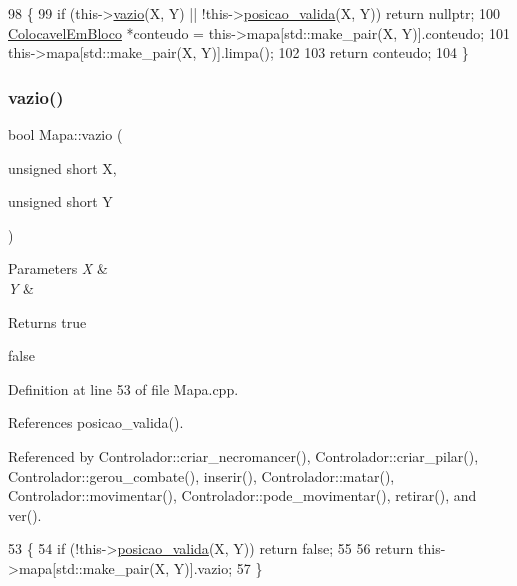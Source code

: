 \begin{DoxyCode}
98                                                                   \{
99     \textcolor{keywordflow}{if} (this->\mbox{\hyperlink{class_mapa_a5bdde997d3c97c5b6fb7d37c124cdf93}{vazio}}(X, Y) || !this->\mbox{\hyperlink{class_mapa_aa07c1444720958b3efbc734d2691361d}{posicao\_valida}}(X, Y)) \textcolor{keywordflow}{return} \textcolor{keyword}{nullptr};
100     \mbox{\hyperlink{class_colocavel_em_bloco}{ColocavelEmBloco}} *conteudo = this->mapa[std::make\_pair(X, Y)].conteudo;
101     this->mapa[std::make\_pair(X, Y)].limpa();
102 
103     \textcolor{keywordflow}{return} conteudo;
104 \}
\end{DoxyCode}
\mbox{\label{class_mapa_a5bdde997d3c97c5b6fb7d37c124cdf93}} 
\subsubsection{\texorpdfstring{vazio()}{vazio()}}
{\footnotesize\ttfamily bool Mapa\+::vazio (\begin{DoxyParamCaption}\item[{unsigned short}]{X,  }\item[{unsigned short}]{Y }\end{DoxyParamCaption})}


\begin{DoxyParams}{Parameters}
{\em X} & \\
\hline
{\em Y} & \\
\hline
\end{DoxyParams}
\begin{DoxyReturn}{Returns}
true 

false 
\end{DoxyReturn}


Definition at line 53 of file Mapa.\+cpp.



References posicao\+\_\+valida().



Referenced by Controlador\+::criar\+\_\+necromancer(), Controlador\+::criar\+\_\+pilar(), Controlador\+::gerou\+\_\+combate(), inserir(), Controlador\+::matar(), Controlador\+::movimentar(), Controlador\+::pode\+\_\+movimentar(), retirar(), and ver().


\begin{DoxyCode}
53                                                    \{
54     \textcolor{keywordflow}{if} (!this->\mbox{\hyperlink{class_mapa_aa07c1444720958b3efbc734d2691361d}{posicao\_valida}}(X, Y)) \textcolor{keywordflow}{return} \textcolor{keyword}{false};
55 
56     \textcolor{keywordflow}{return} this->mapa[std::make\_pair(X, Y)].vazio;
57 \}
\end{DoxyCode}
\mbox{\label{class_mapa_a52dbdf40a47afb56b1cb35dd1cb552f5}} 
